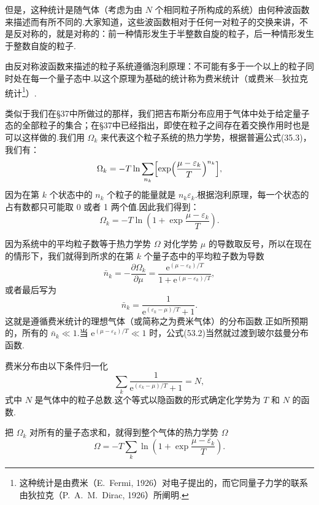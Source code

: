 但是，这种统计是随气体（考虑为由 $N$ 个相同粒子所构成的系统）由何种波函数来描述而有所不同的.大家知道，这些波函数相对于任何一对粒子的交换来讲，不是反对称的，就是对称的：前一种情形发生于半整数自旋的粒子，后一种情形发生于整数自旋的粒子.

由反对称波函数来描述的粒子系统遵循泡利原理：不可能有多于一个以上的粒子同时处在每一个量子态中.以这个原理为基础的统计称为费米统计（或费米—狄拉克统计\footnote{这种统计是由费米（E.~Fermi, 1926）对电子提出的，而它同量子力学的联系由狄拉克（P.~A.~M.~Dirac, 1926）所阐明.}）.

类似于我们在§37中所做过的那样，我们把吉布斯分布应用于气体中处于给定量子态的全部粒子的集合；在§37中已经指出，即使在粒子之间存在着交换作用时也是可以这样做的.我们用 $\Omega_k$ 来代表这个粒子系统的热力学势，根据普遍公式(35.3)，我们有：
\begin{equation}
  \Omega_k=-T\ln\sum_{n_k}\Bigl[\exp\Bigl(\frac{\mu-\varepsilon_k}{T}\Bigr)^{n_k}\Bigr],
\end{equation}
因为在第 $k$ 个状态中的 $n_k$ 个粒子的能量就是 $n_k\varepsilon_k$.根据泡利原理，每一个状态的占有数都只可能取 0 或者 1 两个值.因此我们得到：
\begin{equation*}
  \Omega_k=-T\ln\left(1+\exp\frac{\mu-\varepsilon_k}{T}\right).
\end{equation*}

因为系统中的平均粒子数等于热力学势 $\Omega$ 对化学势 $\mu$ 的导数取反号，所以在现在的情形下，我们就得到所求的在第 $k$ 个量子态中的平均粒子数为导数
\begin{equation*}
  \bar{n}_k=-\frac{\partial\Omega_k}{\partial\mu}
  =\frac{\mathrm{e}^{(\mu-\varepsilon_k)/T}}{1+\mathrm{e}^{(\mu-\varepsilon_k)/T}},
\end{equation*}
或者最后写为
\begin{equation}
  \bar{n}_k=\frac{1}{\mathrm{e}^{(\varepsilon_k-\mu)/T}+1}.
\end{equation}
这就是遵循费米统计的理想气体（或简称之为费米气体）的分布函数.正如所预期的，所有的 $\bar{n}_k\ll1$.当 $\mathrm{e}^{(\mu-\varepsilon_k)/T}\ll1$ 时，公式(53.2)当然就过渡到玻尔兹曼分布函数.

费米分布由以下条件归一化
\begin{equation}
  \sum_k\frac{1}{\mathrm{e}^{(\varepsilon_k-\mu)/T}+1}=N,
\end{equation}
式中 $N$ 是气体中的粒子总数.这个等式以隐函数的形式确定化学势为 $T$ 和 $N$ 的函数.

把 $\Omega_k$ 对所有的量子态求和，就得到整个气体的热力学势 $\Omega$
\begin{equation}
  \Omega=-T\sum_k\ln\left(1+\exp\frac{\mu-\varepsilon_k}{T}\right).
\end{equation}

